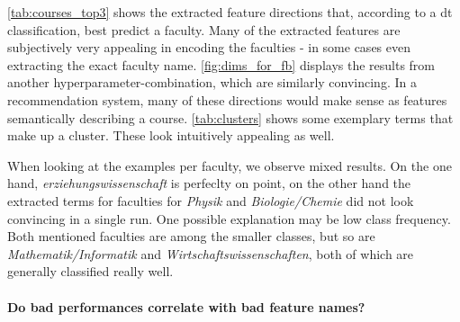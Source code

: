 \autoref{tab:courses_top3} shows the extracted feature directions that, according to a \gls{dt} classification, best predict a faculty. Many of the extracted features are subjectively very appealing in encoding the faculties - in some cases even extracting the exact faculty name. \autoref{fig:dims_for_fb} displays the results from another hyperparameter-combination, which are similarly convincing. In a recommendation system, many of these directions would make sense as features semantically describing a course. \autoref{tab:clusters} shows some exemplary terms that make up a cluster. These look intuitively appealing as well.

When looking at the examples per faculty, we observe mixed results. On the one hand, \eg \textit{erziehungswissenschaft} is perfeclty on point, on the other hand the extracted terms for faculties for \textit{Physik} and \textit{Biologie/Chemie} did not look convincing in a single run. One possible explanation may be low class frequency. Both mentioned faculties are among the smaller classes, but so are \textit{Mathematik/Informatik} and \textit{Wirtschaftswissenschaften}, both of which are generally classified really well.







\paragraph{Do bad performances correlate with bad feature names?}



